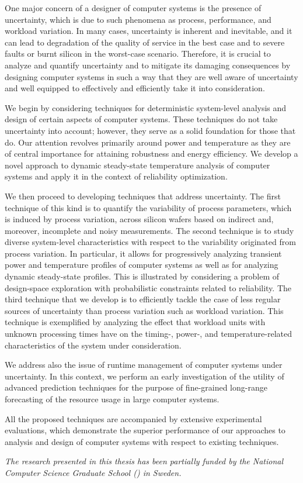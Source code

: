 One major concern of a designer of computer systems is the presence of
uncertainty, which is due to such phenomena as process, performance, and
workload variation. In many cases, uncertainty is inherent and inevitable, and
it can lead to degradation of the quality of service in the best case and to
severe faults or burnt silicon in the worst-case scenario. Therefore, it is
crucial to analyze and quantify uncertainty and to mitigate its damaging
consequences by designing computer systems in such a way that they are well
aware of uncertainty and well equipped to effectively and efficiently take it
into consideration.

We begin by considering techniques for deterministic system-level analysis and
design of certain aspects of computer systems. These techniques do not take
uncertainty into account; however, they serve as a solid foundation for those
that do. Our attention revolves primarily around power and temperature as they
are of central importance for attaining robustness and energy efficiency. We
develop a novel approach to dynamic steady-state temperature analysis of
computer systems and apply it in the context of reliability optimization.

We then proceed to developing techniques that address uncertainty. The first
technique of this kind is to quantify the variability of process parameters,
which is induced by process variation, across silicon wafers based on indirect
and, moreover, incomplete and noisy measurements. The second technique is to
study diverse system-level characteristics with respect to the variability
originated from process variation. In particular, it allows for progressively
analyzing transient power and temperature profiles of computer systems as well
as for analyzing dynamic steady-state profiles. This is illustrated by
considering a problem of design-space exploration with probabilistic constraints
related to reliability. The third technique that we develop is to efficiently
tackle the case of less regular sources of uncertainty than process variation
such as workload variation. This technique is exemplified by analyzing the
effect that workload units with unknown processing times have on the timing-,
power-, and temperature-related characteristics of the system under
consideration.

We address also the issue of runtime management of computer systems under
uncertainty. In this context, we perform an early investigation of the utility
of advanced prediction techniques for the purpose of fine-grained long-range
forecasting of the resource usage in large computer systems.

All the proposed techniques are accompanied by extensive experimental
evaluations, which demonstrate the superior performance of our approaches to
analysis and design of computer systems with respect to existing techniques.

\vspace{1em}
\noindent
\emph{
  The research presented in this thesis has been partially funded by the
  National Computer Science Graduate School () in Sweden.
}
